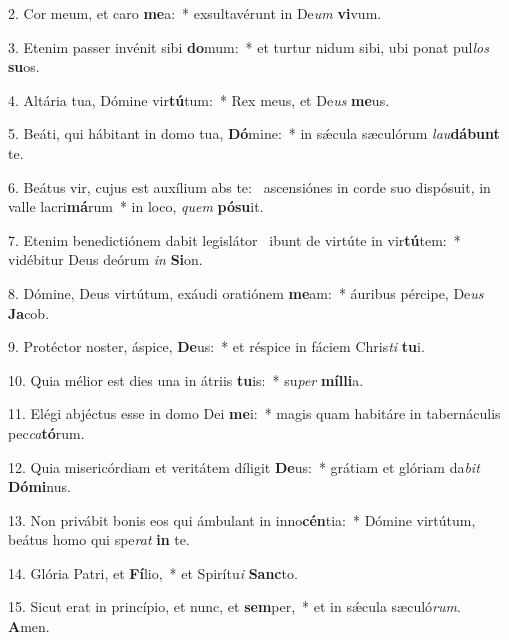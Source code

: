 2. Cor meum, et caro \textbf{me}a:~*  exsultavérunt in De\textit{um} \textbf{vi}vum.\

3. Etenim passer invénit sibi \textbf{do}mum:~*  et turtur nidum sibi, ubi ponat pul\textit{los} \textbf{su}os.\

4. Altária tua, Dómine vir\textbf{tú}tum:~*  Rex meus, et De\textit{us} \textbf{me}us.\

5. Beáti, qui hábitant in domo tua, \textbf{Dó}mine:~*  in sǽcula sæculórum \textit{lau}\textbf{dá}\textbf{bunt} te.\

6. Beátus vir, cujus est auxílium abs te: \dag\  ascensiónes in corde suo dispósuit, in valle lacri\textbf{má}rum~*  in loco, \textit{quem} \textbf{pó}\textbf{su}it.\

7. Etenim benedictiónem dabit legislátor \dag\  ibunt de virtúte in vir\textbf{tú}tem:~*  vidébitur Deus deórum \textit{in} \textbf{Si}on.\

8. Dómine, Deus virtútum, exáudi oratiónem \textbf{me}am:~*  áuribus pércipe, De\textit{us} \textbf{Ja}cob.\

9. Protéctor noster, áspice, \textbf{De}us:~*  et réspice in fáciem Chris\textit{ti} \textbf{tu}i.\

10. Quia mélior est dies una in átriis \textbf{tu}is:~*  su\textit{per} \textbf{míl}\textbf{li}a.\

11. Elégi abjéctus esse in domo Dei \textbf{me}i:~*  magis quam habitáre in tabernáculis pec\textit{ca}\textbf{tó}rum.\

12. Quia misericórdiam et veritátem díligit \textbf{De}us:~*  grátiam et glóriam da\textit{bit} \textbf{Dó}\textbf{mi}nus.\

13. Non privábit bonis eos qui ámbulant in inno\textbf{cén}tia:~*  Dómine virtútum, beátus homo qui spe\textit{rat} \textbf{in} te.\

14. Glória Patri, et \textbf{Fí}lio,~*  et Spirítu\textit{i} \textbf{Sanc}to.\

15. Sicut erat in princípio, et nunc, et \textbf{sem}per,~*  et in sǽcula sæculó\textit{rum}. \textbf{A}men.\

